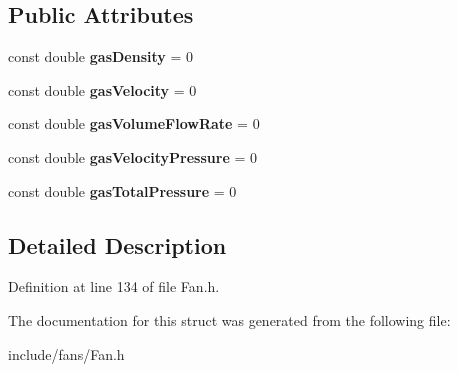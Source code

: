 \subsection*{Public Attributes}
\begin{DoxyCompactItemize}
\item 
\mbox{\label{struct_plane_data_1_1_node_binding_1_1_data_ab95d17426cc7d8141e904baf96a12340}} 
const double {\bfseries gas\+Density} = 0
\item 
\mbox{\label{struct_plane_data_1_1_node_binding_1_1_data_a334b80114bbe976623a7e24fbd546d51}} 
const double {\bfseries gas\+Velocity} = 0
\item 
\mbox{\label{struct_plane_data_1_1_node_binding_1_1_data_a5cbd28074d5a930f0267a9d60b83a04d}} 
const double {\bfseries gas\+Volume\+Flow\+Rate} = 0
\item 
\mbox{\label{struct_plane_data_1_1_node_binding_1_1_data_aa0892de35b2ecc840e2bcdca79f5d1a2}} 
const double {\bfseries gas\+Velocity\+Pressure} = 0
\item 
\mbox{\label{struct_plane_data_1_1_node_binding_1_1_data_a819380996458306f772c305df01d8dba}} 
const double {\bfseries gas\+Total\+Pressure} = 0
\end{DoxyCompactItemize}


\subsection{Detailed Description}


Definition at line 134 of file Fan.\+h.



The documentation for this struct was generated from the following file\+:\begin{DoxyCompactItemize}
\item 
include/fans/Fan.\+h\end{DoxyCompactItemize}
